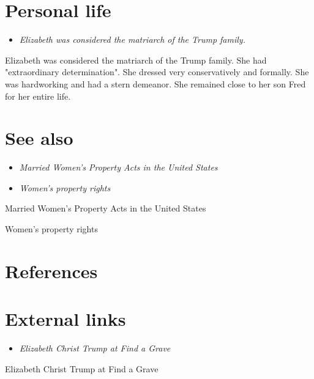 \section{Personal life}\label{personal-life}

\begin{itemize}
\item
  \emph{Elizabeth was considered the matriarch of the Trump family.}
\end{itemize}

Elizabeth was considered the matriarch of the Trump family. She had
"extraordinary determination". She dressed very conservatively and
formally. She was hardworking and had a stern demeanor. She remained
close to her son Fred for her entire life.

\section{See also}\label{see-also}

\begin{itemize}
\item
  \emph{Married Women's Property Acts in the United States}
\item
  \emph{Women's property rights}
\end{itemize}

Married Women's Property Acts in the United States

Women's property rights

\section{References}\label{references}

\section{External links}\label{external-links}

\begin{itemize}
\item
  \emph{Elizabeth Christ Trump at Find a Grave}
\end{itemize}

Elizabeth Christ Trump at Find a Grave
